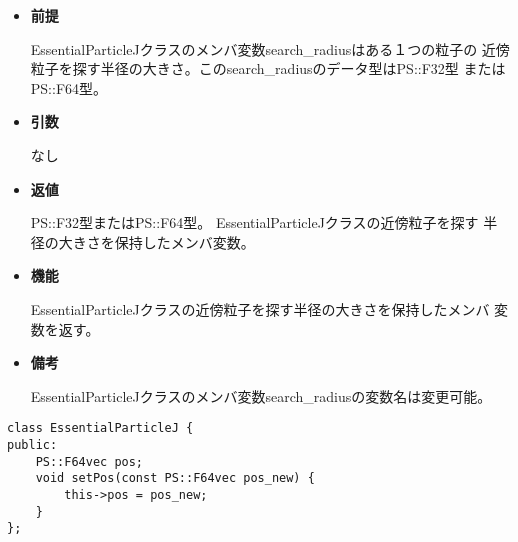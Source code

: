 \begin{itemize}

\item {\bf 前提}

  EssentialParticleJクラスのメンバ変数search\_radiusはある１つの粒子の
  近傍粒子を探す半径の大きさ。このsearch\_radiusのデータ型はPS::F32型
  またはPS::F64型。
  
\item {\bf 引数}

  なし
  
\item {\bf 返値}

  PS::F32型またはPS::F64型。 EssentialParticleJクラスの近傍粒子を探す
  半径の大きさを保持したメンバ変数。
  
\item {\bf 機能}

  EssentialParticleJクラスの近傍粒子を探す半径の大きさを保持したメンバ
  変数を返す。

\item {\bf 備考}

  EssentialParticleJクラスのメンバ変数search\_radiusの変数名は変更可能。
  
\end{itemize}



\begin{screen}
\begin{verbatim}
class EssentialParticleJ {
public:
    PS::F64vec pos;
    void setPos(const PS::F64vec pos_new) {
        this->pos = pos_new;
    }
};
\end{verbatim}
\end{screen}


